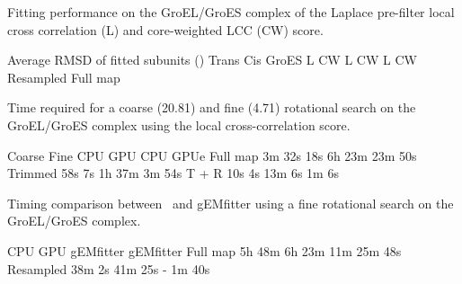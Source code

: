 \caption{}{Fitting performance on the GroEL/GroES complex of the Laplace
pre-filter local cross correlation (L) and core-weighted LCC (CW)
score.}
\stopbuffer

\bTABLE
\setupTABLE[width=broad, align=middle, frame=off]
\setupTABLE[c][1][width=8em]
\setupTABLE[r][1, 4][topframe=on]
\setupTABLE[r][5][bottomframe=on]
\bTABLEhead
\bTR \bTD[nr=3] \eTD \bTD[nc=6] Average RMSD of fitted subunits (\Angstrom) \eTD \eTR
\bTR \bTD[nc=2] Trans \eTD \bTD[nc=2] Cis \eTD \bTD[nc=2] GroES \eTD \eTR
\bTR \bTD L \eTD \bTD CW \eTD \bTD L \eTD \bTD CW \eTD \bTD L \eTD \bTD CW \eTD \eTR
\eTABLEhead
\bTABLEbody
\bTR \bTD Resampled \eTD {} \eTD {} \eTD {} \eTD {} \eTD {} \eTD {} \eTD \eTR
\bTR \bTD Full map \eTD {} \eTD {} \eTD {} \eTD {} \eTD {} \eTD {} \eTD \eTR
\eTABLEbody
\eTABLE
\stopbuffer


\caption{}
{Time required for a coarse (20.81\Deg) and fine (4.71\Deg) rotational search on the
GroEL/GroES complex using the local cross-correlation score.}
\stopbuffer

\bTABLE
\setupTABLE[width=broad, align=middle, frame=off]
\setupTABLE[r][1, 3][topframe=on]
\setupTABLE[r][5][bottomframe=on]
\bTR \bTD[nr=2]  \eTD \bTD[nc=2] Coarse \eTD \bTD[nc=2] Fine \eTD \eTR
\bTR \bTD CPU \eTD \bTD GPU \eTD \bTD CPU \eTD \bTD  GPUe \eTD \eTR
\bTR \bTD Full map \eTD \bTD 3m 32s  \eTD \bTD 18s \eTD \bTD 6h 23m  \eTD \bTD 23m 50s \eTD \eTR
\bTR \bTD Trimmed  \eTD \bTD 58s     \eTD \bTD 7s  \eTD \bTD 1h 37m  \eTD \bTD 3m 54s  \eTD \eTR
\bTR \bTD T + R    \eTD \bTD 10s     \eTD \bTD 4s  \eTD \bTD 13m 6s  \eTD \bTD 1m 6s   \eTD \eTR
\eTABLE
\stopbuffer


\caption{}
{Timing comparison between \powerfit\ and gEMfitter using a fine rotational search on the GroEL/GroES complex.}
\stopbuffer

\bTABLE%
\setupTABLE[width=broad, align=middle, frame=off]
\setupTABLE[r][1, 3][topframe=on]
\setupTABLE[r][4][bottomframe=on]
\bTR \bTD \eTD \bTD[nc=2] CPU \eTD \bTD[nc=2] GPU \eTD \eTR
\bTR \bTD \eTD \bTD gEMfitter \eTD \bTD \powerfit \eTD \bTD gEMfitter \eTD \bTD \powerfit \eTD \eTR
\bTR \bTD Full map \eTD \bTD 5h 48m \eTD \bTD 6h 23m \eTD \bTD 11m \eTD \bTD 25m 48s \eTD \eTR
\bTR \bTD Resampled \eTD \bTD 38m 2s \eTD \bTD 41m 25s \eTD \bTD - \eTD \bTD 1m 40s \eTD \eTR
\eTABLE
\stopbuffer


